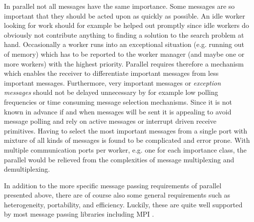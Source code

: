 In parallel \eclipse not all messages have the same importance. Some messages
are so important that they should be acted upon as quickly as possible. An 
idle worker looking for work should for example be helped out promptly since 
idle workers do obviously not contribute anything to finding a solution to the 
search problem at hand. Occasionally a worker runs into an exceptional 
situation (e.g. running out of memory) which has to be reported to the 
worker manager (and maybe one or more workers) with the highest priority. 
Parallel \eclipse requires therefore a mechanism which enables the receiver 
to differentiate important messages from less important messages. Furthermore, 
very important messages or {\it exception messages} should not be delayed 
unnecessary by for example low polling frequencies or time consuming message 
selection mechanisms. Since it is not known in advance if and when messages 
will be sent it is appealing to avoid message polling and rely on active 
messages \cite{am:acm92} or interrupt driven receive primitives. Having to
select the most important messages from a single port with mixture of all
kinds of messages is found to be complicated and error prone. With multiple
communication ports per worker, e.g. one for each importance class, the
parallel \eclipse would be relieved from the complexities of message 
multiplexing and demultiplexing. 

In addition to the more specific message passing requirements of parallel
\eclipse presented above, there are of course also some general requirements
such as heterogeneity, portability, and efficiency. Luckily, these are 
quite well supported by most message passing libraries including 
MPI \cite{mpi:hpcn94,mpi:manual}. 

